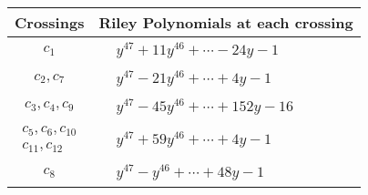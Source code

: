 \documentclass[1p]{elsarticle_modified}
\theoremstyle{definition}
\begin{document}
\begin{tabular}{m{50pt}|m{274pt}}
Crossings & \hspace{64pt}Riley Polynomials at each crossing \\
\hline $$\begin{aligned}c_{1}\end{aligned}$$&$\begin{aligned}
&y^{47}+11 y^{46}+\cdots-24 y-1
\end{aligned}$\\
\hline $$\begin{aligned}c_{2},c_{7}\end{aligned}$$&$\begin{aligned}
&y^{47}-21 y^{46}+\cdots+4 y-1
\end{aligned}$\\
\hline $$\begin{aligned}c_{3},c_{4},c_{9}\end{aligned}$$&$\begin{aligned}
&y^{47}-45 y^{46}+\cdots+152 y-16
\end{aligned}$\\
\hline $$\begin{aligned}c_{5},c_{6},c_{10}\\c_{11},c_{12}\end{aligned}$$&$\begin{aligned}
&y^{47}+59 y^{46}+\cdots+4 y-1
\end{aligned}$\\
\hline $$\begin{aligned}c_{8}\end{aligned}$$&$\begin{aligned}
&y^{47}- y^{46}+\cdots+48 y-1
\end{aligned}$\\
\hline
\end{tabular}
\vskip 2pc
\end{document}
